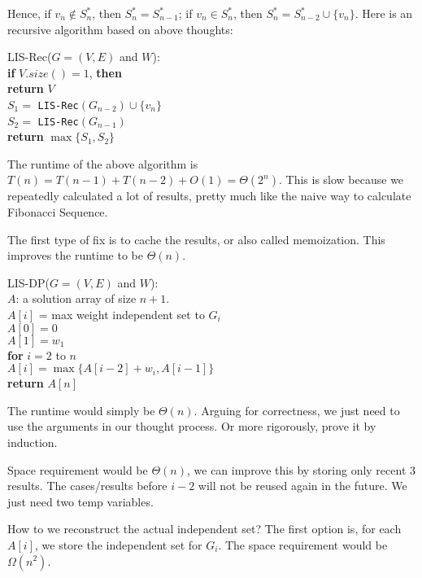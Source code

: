 \documentclass[twoside]{article}
\newcommand{\pc}[1]{\mbox{\textbf{#1}}} %
\begin{document}
Hence, if $v_n \notin S^*_n$, then $S^*_n = S^*_{n-1}$; if $v_n \in S^*_n$, then $S^*_n = S^*_{n-2} \cup \{v_n\}$. Here is an recursive algorithm based on above thoughts:
\begin{algorithme}
	LIS-Rec($G = (V, E)$ and $W$): \\
	\>\pc{if} $V.size() = 1$, \pc{then}\\
	\>\>\pc{return} $V$\\
	\>$S_1 = $ \texttt{LIS-Rec}$(G_{n-2}) \cup \{v_n\}$\\
	\>$S_2 = $ \texttt{LIS-Rec}$(G_{n-1})$\\
	\>\pc{return} $\max \{S_1, S_2\}$
\end{algorithme}
The runtime of the above algorithm is $T(n) = T(n-1) + T(n-2) + O(1) = \Theta(2^n)$. This is slow because we repeatedly calculated a lot of results, pretty much like the naive way to calculate Fibonacci Sequence. 

The first type of fix is to cache the results, or also called memoization. This improves the runtime to be $\Theta(n)$. 

\begin{algorithme}
	LIS-DP($G = (V, E)$ and $W$): \\
	$A$: a solution array of size $n + 1$. \\
	$A[i]$ = max weight independent set to $G_i$\\
	\>$A[0] = 0$\\
	\>$A[1] = w_1$\\
	\>\pc{for} $i = 2$ to $n$\\
	\>\>$A[i] = \max \{A[i-2] + w_i, A[i-1]\}$ \\
	\>\pc{return} $A[n]$
\end{algorithme}
The runtime would simply be $\Theta(n)$. Arguing for correctness, we just need to use the arguments in our thought process. Or more rigorously, prove it by induction. 

Space requirement would be $\Theta(n)$, we can improve this by storing only recent 3 results. The cases/results before $i-2$ will not be reused again in the future. We just need two temp variables. 

How to we reconstruct the actual independent set? The first option is, for each $A[i]$, we store the independent set for $G_i$. The space requirement would be $\Omega(n^2)$. 
\end{document}
